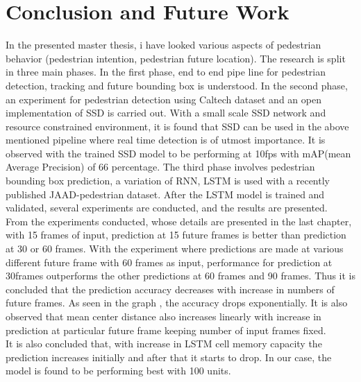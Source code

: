
\chapter{Conclusion and Future Work}
In the presented master thesis, i have looked various aspects of pedestrian behavior (pedestrian intention, pedestrian future location). The research is split in three main phases. In the first phase, end to end pipe line for pedestrian detection, tracking and future bounding box is understood. In the second phase, an experiment for pedestrian detection using Caltech dataset and an open implementation of SSD is carried out. With a small scale SSD network and resource constrained environment, it is found that SSD can be used in the above mentioned pipeline where real time detection is of utmost importance. It is observed with the trained SSD model to be performing at 10fps with mAP(mean Average Precision) of 66 percentage. The third phase involves pedestrian bounding box prediction, a variation of RNN, LSTM is used with a recently published JAAD-pedestrian dataset. After the LSTM model is trained and validated, several experiments are conducted, and the results are presented. \\

From the experiments conducted, whose details are presented in the last chapter, with 15 frames of input, prediction at 15 future frames is better than prediction at 30 or 60 frames. With the experiment where predictions are made at various different future frame with 60 frames as input, performance for prediction at 30frames outperforms the other predictions at 60 frames and 90 frames. Thus it is concluded that the prediction accuracy decreases with increase in numbers of future frames. As seen in the graph , the accuracy drops exponentially. It is also observed that mean center distance also increases linearly with increase in prediction at particular future frame keeping number of input frames fixed. \\

It is also concluded that, with increase in LSTM cell memory capacity the prediction increases initially and after that it starts to drop. In our case, the model is found to be performing best with 100 units. \\


